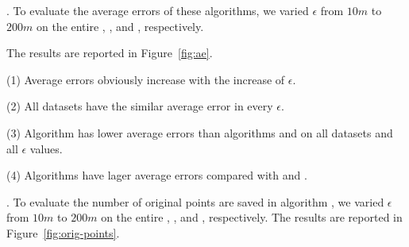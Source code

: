 .
To evaluate the average errors of these algorithms, we varied $\epsilon$ from $10m$ to $200m$ on the entire \truck, \sercar, \geolife and \pricar, respectively.

The results are reported in Figure~\ref{fig:ae}.

\ni(1) Average errors obviously increase with the increase of $\epsilon$.

\ni(2) All datasets have the similar average \sed error in every $\epsilon$.

\ni(3) Algorithm \squishe has lower average errors than algorithms \dpa and \cist on all datasets and all $\epsilon$ values.

\ni(4) Algorithms \cist have lager average errors compared with \dpa and \squishe.



.
To evaluate the number of original points are saved in algorithm \cista, we varied $\epsilon$ from $10m$ to $200m$ on the entire \truck, \sercar, \geolife and \pricar, respectively.
The results are reported in Figure~\ref{fig:orig-points}.






